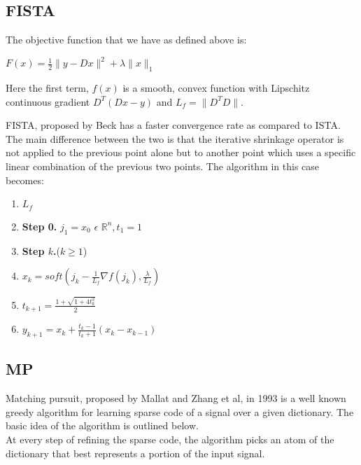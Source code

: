 \documentclass{article} %
\begin{document}
\vspace{.2cm}
\subsection{FISTA}
\vspace{.2cm}
The objective function that we have as defined above is:
\begin{center}
$F(x) = \frac{1}{2}\|y - Dx\|^2 + \lambda\|x\|_1$
\end{center}

Here the first term, $f(x)$ is a smooth, convex function with Lipschitz continuous gradient $D^T(Dx - y)$ and $L_f = \|D^TD\|$.

FISTA, proposed by Beck \citep{beck2009fast} has a faster convergence rate as compared to ISTA. The main difference between the two is that the iterative shrinkage operator is not applied to the previous point alone but to another point which uses a specific linear combination of the previous two points. The algorithm in this case becomes:

\begin{enumerate}
\item \textbf{$L_f$}
\item \textbf{Step 0. }$j_1 = x_0$ $\epsilon$ $\mathbb{R}^n, t_1 = 1$
\item \textbf{Step $k$.}($k \geq 1$)
\item \hspace{.4cm} $x_k = soft(j_k - \frac{1}{L_f}\nabla f(j_k), \frac{\lambda}{L_f})$
\item \hspace{.4cm} $t_{k+1} = \frac{1+\sqrt{1+4t_k^2}}{2}$
\item \hspace{.4cm} $y_{k+1} = x_k + \frac{t_k-1}{t_k+1}(x_k - x_{k-1})$
\end{enumerate}

\subsection{MP}
  Matching pursuit, proposed by Mallat and Zhang et al, in 1993 is a well known greedy algorithm for learning sparse code of a signal over a given dictionary. The basic idea of the algorithm is outlined below.\\ 
At every step of refining the sparse code, the algorithm picks an atom of the dictionary that best represents a portion of the input signal. \\
\end{document}
